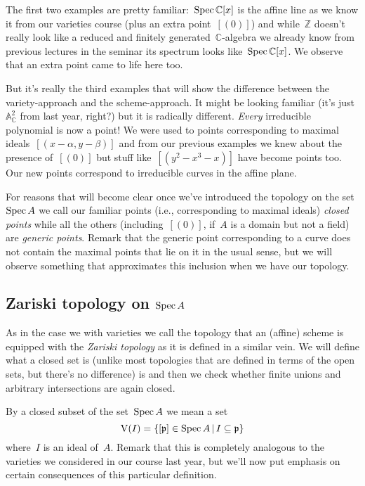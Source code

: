 The first two examples are pretty familiar:~$\operatorname{Spec}\mathbb{C}[x]$ is the affine line as we know it from our varieties course (plus an extra point~$[(0)]$) and while~$\mathbb{Z}$ doesn't really look like a reduced and finitely generated~$\mathbb{C}$-algebra we already know from previous lectures in the seminar its spectrum looks like~$\operatorname{Spec}\mathbb{C}[x]$. We observe that an extra point came to life here too.

But it's really the third examples that will show the difference between the variety-approach and the scheme-approach. It might be looking familiar (it's just~$\mathbb{A}^2_{\mathbb{C}}$ from last year, right?) but it is radically different. \emph{Every} irreducible polynomial is now a point! We were used to points corresponding to maximal ideals~$[(x-\alpha,y-\beta)]$ and from our previous examples we knew about the presence of~$[(0)]$ but stuff like~$[(y^2-x^3-x)]$ have become points too. Our new points correspond to irreducible curves in the affine plane.

For reasons that will become clear once we've introduced the topology on the set~$\operatorname{Spec} A$ we call our familiar points (i.e., corresponding to maximal ideals) \emph{closed points} while all the others (including~$[(0)]$, if~$A$ is a domain but not a field) are \emph{generic points}. Remark that the generic point corresponding to a curve does not contain the maximal points that lie on it in the usual sense, but we will observe something that approximates this inclusion when we have our topology.

\subsection{Zariski topology on $\operatorname{Spec} A$}
As in the case we with varieties we call the topology that an (affine) scheme is equipped with the \emph{Zariski topology} as it is defined in a similar vein. We will define what a closed set is (unlike most topologies that are defined in terms of the open sets, but there's no difference) is and then we check whether finite unions and arbitrary intersections are again closed.

By a closed subset of the set~$\operatorname{Spec} A$ we mean a set
\begin{equation}
  \operatorname{V}(I)=\left\{ [\mathfrak{p}]\in\operatorname{Spec} A\,|\,I\subseteq\mathfrak{p} \right\}
\end{equation}
where~$I$ is an ideal of~$A$. Remark that this is completely analogous to the varieties we considered in our course last year, but we'll now put emphasis on certain consequences of this particular definition.

